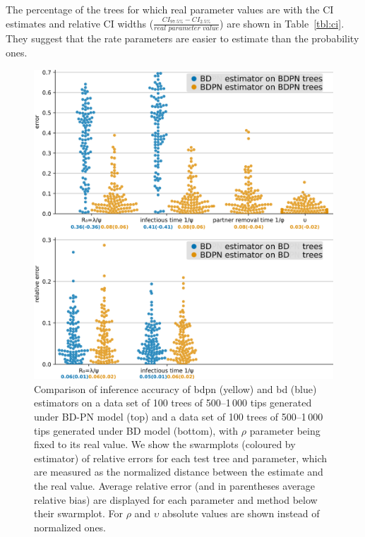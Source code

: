 \documentclass[a4paper,10pt]{article}
\begin{document}

The percentage of the trees for which real parameter values are with the CI estimates and relative CI widths ($\frac{CI_{97.5\%} - CI_{2.5\%}}{\textit{real parameter value}}$) are shown in Table~\ref{tbl:ci}. They suggest that the rate parameters are easier to estimate than the probability ones.

\begin{figure}[!pht]
\centering 
\includegraphics[width=1\textwidth]{Fig_errors_p.png}
\caption{Comparison of inference accuracy of bdpn (yellow) and bd (blue) estimators on a data set of 100 trees of 500--1\,000 tips generated under BD-PN model (top) and a data set of 100 trees of 500--1\,000 tips generated under BD model (bottom), with $\rho$ parameter being fixed to its real value.
We show the swarmplots (coloured by estimator) of relative errors for each test tree and parameter, which are measured as the normalized distance between the estimate and the real value. Average relative error (and in parentheses average relative bias) are displayed for each parameter and method below their swarmplot. For $\rho$ and $\upsilon$ absolute values are shown instead of normalized ones. } 
\label{fig:sim} 
\end{figure}
 
\end{document}
